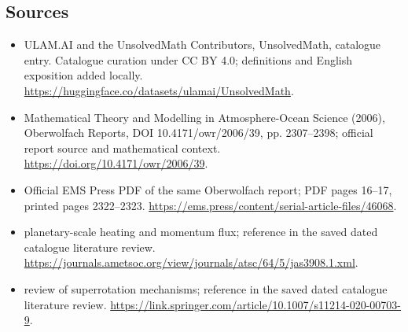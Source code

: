 \documentclass[11pt]{article}
\begin{document}
\subsection{Sources}
\begin{itemize}
\item[\hypertarget{source:statement:1}{S1}] ULAM.AI and the UnsolvedMath Contributors, UnsolvedMath, catalogue entry. Catalogue curation under CC BY 4.0; definitions and English exposition added locally.
\url{https://huggingface.co/datasets/ulamai/UnsolvedMath}.
\item[\hypertarget{source:statement:2}{S2}] Mathematical Theory and Modelling in Atmosphere-Ocean Science (2006), Oberwolfach Reports, DOI 10.4171/owr/2006/39, pp. 2307--2398; official report source and mathematical context.
\url{https://doi.org/10.4171/owr/2006/39}.
\item[\hypertarget{source:statement:3}{S3}] Official EMS Press PDF of the same Oberwolfach report; PDF pages 16--17, printed pages 2322--2323.
\url{https://ems.press/content/serial-article-files/46068}.
\item[\hypertarget{source:statement:4}{S4}] planetary-scale heating and momentum flux; reference in the saved dated catalogue literature review.
\url{https://journals.ametsoc.org/view/journals/atsc/64/5/jas3908.1.xml}.
\item[\hypertarget{source:statement:5}{S5}] review of superrotation mechanisms; reference in the saved dated catalogue literature review.
\url{https://link.springer.com/article/10.1007/s11214-020-00703-9}.
\end{itemize}
\label{end:statement}
\end{document}
